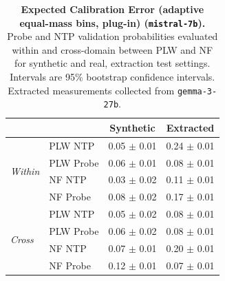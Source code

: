 \begin{table}[ht]
\centering
\begin{tabular}{ll cc}
\toprule
& & Synthetic & Extracted \\
\midrule
\multirow{4}{*}{\textit{Within}}
& PLW NTP & 0.05 $\pm$ 0.01 & 0.24 $\pm$ 0.01 \\
& PLW Probe & 0.06 $\pm$ 0.01 & 0.08 $\pm$ 0.01 \\
& NF NTP & 0.03 $\pm$ 0.02 & 0.11 $\pm$ 0.01 \\
& NF Probe & 0.08 $\pm$ 0.02 & 0.17 $\pm$ 0.01 \\
\midrule
\multirow{4}{*}{\textit{Cross}}
& PLW NTP & 0.05 $\pm$ 0.02 & 0.08 $\pm$ 0.01 \\
& PLW Probe & 0.06 $\pm$ 0.02 & 0.08 $\pm$ 0.01 \\
& NF NTP & 0.07 $\pm$ 0.01 & 0.20 $\pm$ 0.01 \\
& NF Probe & 0.12 $\pm$ 0.01 & 0.07 $\pm$ 0.01 \\
\bottomrule
\end{tabular}
\caption{\textbf{Expected Calibration Error (adaptive equal-mass bins, plug-in) (\texttt{mistral-7b}).} Probe and NTP validation probabilities evaluated within and cross-domain between PLW and NF for synthetic and real, extraction test settings. Intervals are 95\% bootstrap confidence intervals. Extracted measurements collected from \texttt{gemma-3-27b}.}
\label{tab:mistral-7b-gemma-3-27b-pond_nfix-ece_em}
\end{table}
